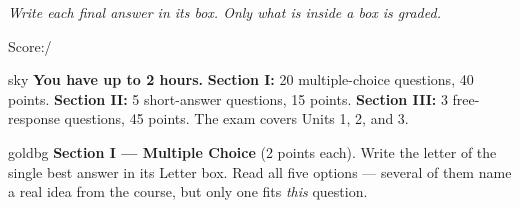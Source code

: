 \documentclass[12pt]{article}
\begin{document}
{\small\itshape Write each final answer in its box. Only what is inside a box is graded.}\par

\hfill\small Score:\;\blank{1.3cm}\;/\normalsize
\vspace{0.06in}

\boxguard[8]
\begin{headlinebox}{sky}
\small
\textbf{You have up to 2 hours.} \textbf{Section I:} 20 multiple-choice questions, 40 points.
\textbf{Section II:} 5 short-answer questions, 15 points. \textbf{Section III:} 3 free-response
questions, 45 points. The exam covers Units 1, 2, and 3.
\end{headlinebox}

\vspace{0.08in}

\boxguard[10]
\begin{headlinebox}{goldbg}
\small
\textbf{Section I --- Multiple Choice} (2 points each). Write the letter of the single best answer in its Letter box. Read all
five options --- several of them name a real idea from the course, but only one fits \emph{this}
question.
\end{headlinebox}

\vspace{0.10in}
\end{document}
